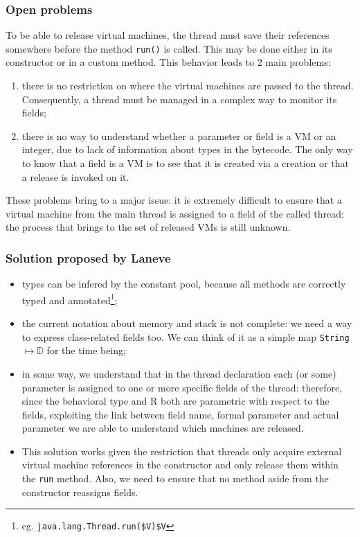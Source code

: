 \documentclass{amsart}
\newcommand{\data}{\mathbb{D}}
\newcommand{\wrt}{with respect to}
\numberwithin{equation}{section}
\theoremstyle{plain} %
\theoremstyle{definition}
\theoremstyle{remark}
\begin{document}
\subsubsection{Open problems}
To be able to release virtual machines, the thread must save their references somewhere before the method \texttt{run()} is called. This may be done either in its constructor or in a custom method. This behavior leads to 2 main problems:
\begin{enumerate}
\item there is no restriction on where the virtual machines are passed to the thread. Consequently, a thread must be managed in a complex way to monitor its fields;
\item there is no way to understand whether a parameter or field is a VM or an integer, due to lack of information about types in the bytecode. The only way to know that a field is a VM is to see that it is created via a creation or that a release is invoked on it.
\end{enumerate}
These problems bring to a major issue: it is extremely difficult to ensure that a virtual machine from the main thread is assigned to a field of the called thread: the process that brings to the set of released VMs is still unknown.
\subsubsection{Solution proposed by Laneve}
\begin{itemize}
\item types can be infered by the constant pool, because all methods are correctly typed and annotated\footnote{eg. \texttt{java.lang.Thread.run(\$V)\$V}};
\item the current notation about memory and stack is not complete: we need a way to express class-related fields too. We can think of it as a simple map \texttt{String} $\mapsto \data{}$ for the time being;
\item in some way, we understand that in the thread declaration each (or some) parameter is assigned to one or more specific fields of the thread: therefore, since the behavioral type and R both are parametric \wrt{} the fields, exploiting the link between field name, formal parameter and actual parameter we are able to understand which machines are released.
\item This solution works given the restriction that threads only acquire external virtual machine references in the constructor and only release them within the \texttt{run} method. Also, we need to ensure that no method aside from the constructor reassigns fields.
\end{itemize}
\end{document}
